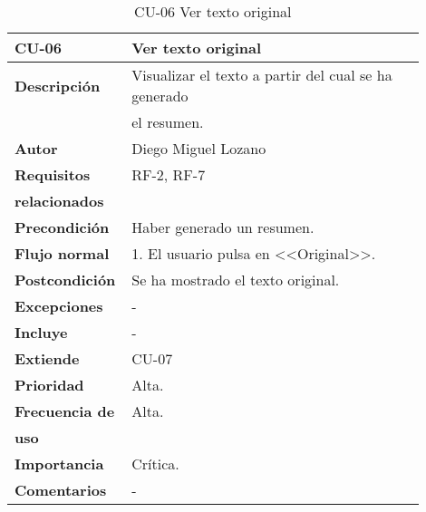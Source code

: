 \begin{longtable}{>{\raggedright}b{0.2\linewidth}>{\raggedright\arraybackslash}b{0.7\linewidth}}
	\toprule
	\textbf{CU-06} & \textbf{Ver texto original} \\
	\toprule
	\endhead
	
	\toprule
	\caption{CU-06 Ver texto original}
	\endfoot
	
	\small{\textbf{Descripción}} & Visualizar el texto a partir del cual se ha generado \\
	& el resumen. \\
	\small{\textbf{Autor}} & Diego Miguel Lozano \\
	\small{\textbf{Requisitos}} & RF-2, RF-7  \\
	\small{\textbf{relacionados}} & \\
	\small{\textbf{Precondición}} & Haber generado un resumen. \\
	\small{\textbf{Flujo normal}} & \quad \small{1. El usuario pulsa en <<Original>>. } \\
	\small{\textbf{Postcondición}} & Se ha mostrado el texto original.\\
	\small{\textbf{Excepciones}} & - \\
	\small{\textbf{Incluye}} & - \\
	\small{\textbf{Extiende}} & CU-07 \\
	\small{\textbf{Prioridad}} & Alta. \\
	\small{\textbf{Frecuencia de}} & Alta. \\
	\small{\textbf{uso}} & \\
	\small{\textbf{Importancia}} & Crítica. \\
	\small{\textbf{Comentarios}} & - \\
\end{longtable}


